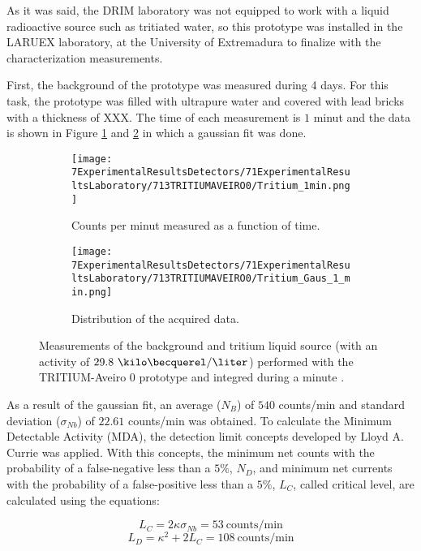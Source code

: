 As it was said, the DRIM laboratory was not equipped to work with a liquid radioactive source such as tritiated water, so this prototype was installed in the LARUEX laboratory, at the University of Extremadura to finalize with the characterization measurements. 

First, the background of the prototype was measured during 4 days. For this task, the prototype was filled with ultrapure water and covered with lead bricks with a thickness of XXX. The time of each measurement is $1$ minut and the data is shown in Figure \ref{subfig:MeasurementInRealTime} and \ref{subfig:DistributionofMeasurement} in which a gaussian fit was done. 

\begin{figure}
\centering
    \begin{subfigure}[b]{0.45\textwidth}
    \centering
    \texttt{[image: 7ExperimentalResultsDetectors/71ExperimentalResultsLaboratory/713TRITIUMAVEIRO0/Tritium\_1min.png]}  
    \caption{Counts per minut measured as a function of time.\label{subfig:MeasurementInRealTime}}
    \end{subfigure}
    \hfill
    \begin{subfigure}[b]{0.45\textwidth}
    \centering
    \texttt{[image: 7ExperimentalResultsDetectors/71ExperimentalResultsLaboratory/713TRITIUMAVEIRO0/Tritium\_Gaus\_1\_min.png]}  
    \caption{Distribution of the acquired data.\label{subfig:DistributionofMeasurement}}
    \end{subfigure}
 \caption{Measurements of the background and tritium liquid source (with an activity of $29.8~\kilo\becquerel/\liter$) performed with the TRITIUM-Aveiro 0 prototype and integred during a minute \cite{ExperimentalPaperCarlos}.}
 \label{fig:BackgroundTritium1min}
\end{figure}

As a result of the gaussian fit, an average ($N_B$) of $540$ counts/min and standard deviation ($\sigma_{Nb}$) of $22.61$ counts/min was obtained. To calculate the Minimum Detectable Activity (MDA), the detection limit concepts developed by Lloyd A. Currie \cite{CurieLimit} was applied.  With this concepts, the minimum net counts with the probability of a false-negative less than a $5\%$, $N_D$, and minimum net currents with the probability of a false-positive less than a $5\%$, $L_C$, called critical level, are calculated using the equations:

\begin{equation}
L_C = 2\kappa\sigma_{Nb} =53 ~\text{counts/min}
\label{eq:EquationCriticalLimit}
\end{equation}
\begin{equation}
L_D = \kappa^2 + 2L_C = 108~\text{counts/min}
\label{eq:EquationNetCounts}
\end{equation}

